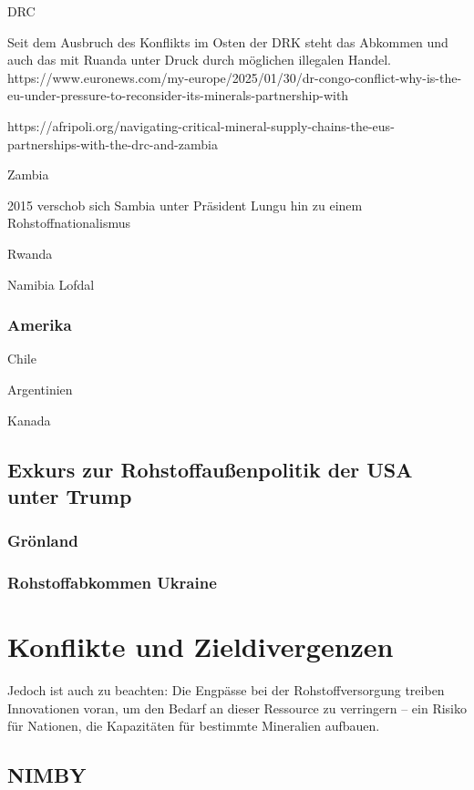 \documentclass[12pt,a4paper,oneside]{book} %
\begin{document}
DRC

Seit dem Ausbruch des Konflikts im Osten der DRK steht das Abkommen und auch das mit Ruanda unter Druck durch möglichen illegalen Handel.
https://www.euronews.com/my-europe/2025/01/30/dr-congo-conflict-why-is-the-eu-under-pressure-to-reconsider-its-minerals-partnership-with

https://afripoli.org/navigating-critical-mineral-supply-chains-the-eus-partnerships-with-the-drc-and-zambia

Zambia

2015 verschob sich Sambia unter Präsident Lungu hin zu einem Rohstoffnationalismus 

Rwanda

Namibia
Lofdal 






\subsubsection{Amerika}
Chile

Argentinien

Kanada

\subsection{Exkurs zur Rohstoffaußenpolitik der USA unter Trump}

\subsubsection{Grönland}

\subsubsection{Rohstoffabkommen Ukraine}



\section{Konflikte und Zieldivergenzen}

Jedoch ist auch zu beachten: Die Engpässe bei der Rohstoffversorgung treiben Innovationen voran, um den Bedarf an dieser Ressource zu verringern – ein Risiko für Nationen, die Kapazitäten für bestimmte Mineralien aufbauen.

\subsection{NIMBY}
\end{document}
